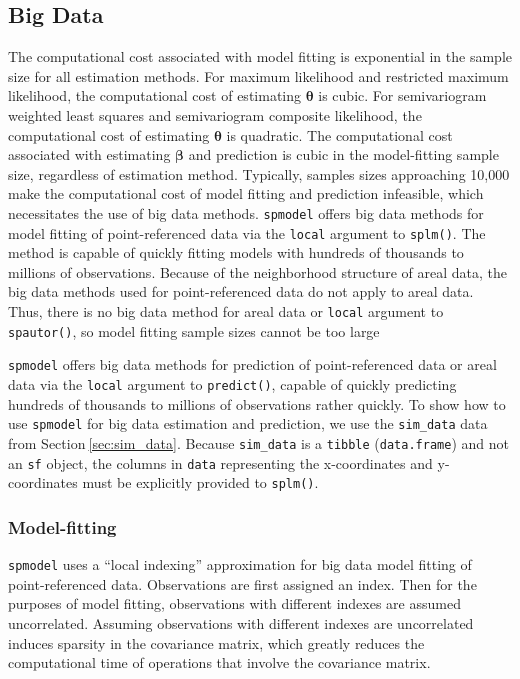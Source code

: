 \documentclass[10pt,letterpaper]{article}
\begin{document}
\hypertarget{big-data}{%
\subsection{Big Data}\label{big-data}}

The computational cost associated with model fitting is exponential in
the sample size for all estimation methods. For maximum likelihood and
restricted maximum likelihood, the computational cost of estimating
\(\boldsymbol{\theta}\) is cubic. For semivariogram weighted least
squares and semivariogram composite likelihood, the computational cost
of estimating \(\boldsymbol{\theta}\) is quadratic. The computational
cost associated with estimating \(\boldsymbol{\beta}\) and prediction is
cubic in the model-fitting sample size, regardless of estimation method.
Typically, samples sizes approaching 10,000 make the computational cost
of model fitting and prediction infeasible, which necessitates the use
of big data methods. \texttt{spmodel} offers big data methods for model
fitting of point-referenced data via the \texttt{local} argument to
\texttt{splm()}. The method is capable of quickly fitting models with
hundreds of thousands to millions of observations. Because of the
neighborhood structure of areal data, the big data methods used for
point-referenced data do not apply to areal data. Thus, there is no big
data method for areal data or \texttt{local} argument to
\texttt{spautor()}, so model fitting sample sizes cannot be too large

\texttt{spmodel} offers big data methods for prediction of
point-referenced data or areal data via the \texttt{local} argument to
\texttt{predict()}, capable of quickly predicting hundreds of thousands
to millions of observations rather quickly. To show how to use
\texttt{spmodel} for big data estimation and prediction, we use the
\texttt{sim\_data} data from Section\(~\)\ref{sec:sim_data}. Because
\texttt{sim\_data} is a \texttt{tibble} (\texttt{data.frame}) and not an
\texttt{sf} object, the columns in \texttt{data} representing the
x-coordinates and y-coordinates must be explicitly provided to
\texttt{splm()}.

\hypertarget{model-fitting}{%
\subsubsection{Model-fitting}\label{model-fitting}}

\texttt{spmodel} uses a ``local indexing'' approximation for big data
model fitting of point-referenced data. Observations are first assigned
an index. Then for the purposes of model fitting, observations with
different indexes are assumed uncorrelated. Assuming observations with
different indexes are uncorrelated induces sparsity in the covariance
matrix, which greatly reduces the computational time of operations that
involve the covariance matrix.
\end{document}
